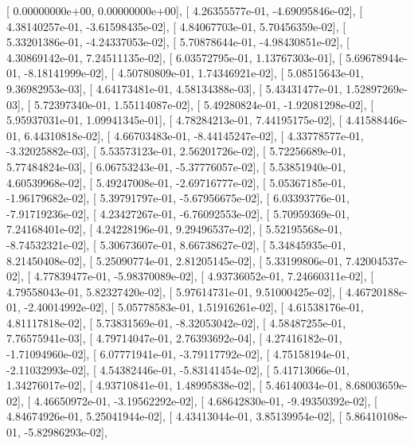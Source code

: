 \documentclass{article}
\begin{document}
       [  0.00000000e+00,   0.00000000e+00],
       [  4.26355577e-01,  -4.69095846e-02],
       [  4.38140257e-01,  -3.61598435e-02],
       [  4.84067703e-01,   5.70456359e-02],
       [  5.33201386e-01,  -4.24337053e-02],
       [  5.70878644e-01,  -4.98430851e-02],
       [  4.30869142e-01,   7.24511135e-02],
       [  6.03572795e-01,   1.13767303e-01],
       [  5.69678944e-01,  -8.18141999e-02],
       [  4.50780809e-01,   1.74346921e-02],
       [  5.08515643e-01,   9.36982953e-03],
       [  4.64173481e-01,   4.58134388e-03],
       [  5.43431477e-01,   1.52897269e-03],
       [  5.72397340e-01,   1.55114087e-02],
       [  5.49280824e-01,  -1.92081298e-02],
       [  5.95937031e-01,   1.09941345e-01],
       [  4.78284213e-01,   7.44195175e-02],
       [  4.41588446e-01,   6.44310818e-02],
       [  4.66703483e-01,  -8.44145247e-02],
       [  4.33778577e-01,  -3.32025882e-03],
       [  5.53573123e-01,   2.56201726e-02],
       [  5.72256689e-01,   5.77484824e-03],
       [  6.06753243e-01,  -5.37776057e-02],
       [  5.53851940e-01,   4.60539968e-02],
       [  5.49247008e-01,  -2.69716777e-02],
       [  5.05367185e-01,  -1.96179682e-02],
       [  5.39791797e-01,  -5.67956675e-02],
       [  6.03393776e-01,  -7.91719236e-02],
       [  4.23427267e-01,  -6.76092553e-02],
       [  5.70959369e-01,   7.24168401e-02],
       [  4.24228196e-01,   9.29496537e-02],
       [  5.52195568e-01,  -8.74532321e-02],
       [  5.30673607e-01,   8.66738627e-02],
       [  5.34845935e-01,   8.21450408e-02],
       [  5.25090774e-01,   2.81205145e-02],
       [  5.33199806e-01,   7.42004537e-02],
       [  4.77839477e-01,  -5.98370089e-02],
       [  4.93736052e-01,   7.24660311e-02],
       [  4.79558043e-01,   5.82327420e-02],
       [  5.97614731e-01,   9.51000425e-02],
       [  4.46720188e-01,  -2.40014992e-02],
       [  5.05778583e-01,   1.51916261e-02],
       [  4.61538176e-01,   4.81117818e-02],
       [  5.73831569e-01,  -8.32053042e-02],
       [  4.58487255e-01,   7.76575941e-03],
       [  4.79714047e-01,   2.76393692e-04],
       [  4.27416182e-01,  -1.71094960e-02],
       [  6.07771941e-01,  -3.79117792e-02],
       [  4.75158194e-01,  -2.11032993e-02],
       [  4.54382446e-01,  -5.83141454e-02],
       [  5.41713066e-01,   1.34276017e-02],
       [  4.93710841e-01,   1.48995838e-02],
       [  5.46140034e-01,   8.68003659e-02],
       [  4.46650972e-01,  -3.19562292e-02],
       [  4.68642830e-01,  -9.49350392e-02],
       [  4.84674926e-01,   5.25041944e-02],
       [  4.43413044e-01,   3.85139954e-02],
       [  5.86410108e-01,  -5.82986293e-02],
\end{document}
